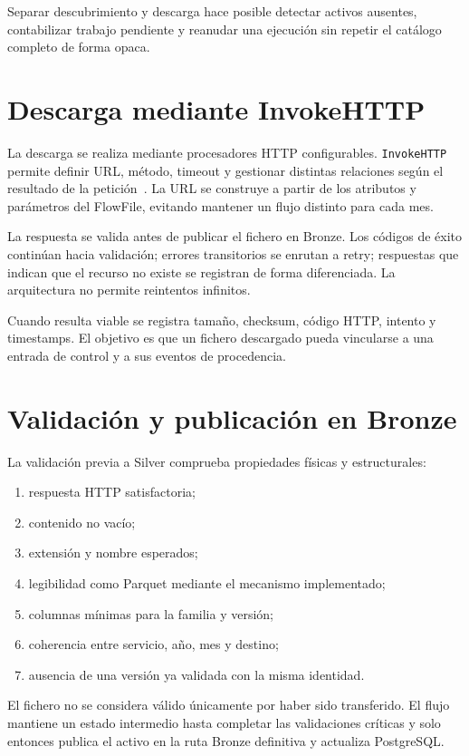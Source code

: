 Separar descubrimiento y descarga hace posible detectar activos ausentes, contabilizar trabajo pendiente y reanudar una ejecución sin repetir el catálogo completo de forma opaca.

\section{Descarga mediante InvokeHTTP}

La descarga se realiza mediante procesadores HTTP configurables. \texttt{InvokeHTTP} permite definir URL, método, timeout y gestionar distintas relaciones según el resultado de la petición~\cite{nifi_invokehttp}. La URL se construye a partir de los atributos y parámetros del FlowFile, evitando mantener un flujo distinto para cada mes.

La respuesta se valida antes de publicar el fichero en Bronze. Los códigos de éxito continúan hacia validación; errores transitorios se enrutan a retry; respuestas que indican que el recurso no existe se registran de forma diferenciada. La arquitectura no permite reintentos infinitos.

Cuando resulta viable se registra tamaño, checksum, código HTTP, intento y timestamps. El objetivo es que un fichero descargado pueda vincularse a una entrada de control y a sus eventos de procedencia.

\section{Validación y publicación en Bronze}

La validación previa a Silver comprueba propiedades físicas y estructurales:

\begin{enumerate}
\item respuesta HTTP satisfactoria;
\item contenido no vacío;
\item extensión y nombre esperados;
\item legibilidad como Parquet mediante el mecanismo implementado;
\item columnas mínimas para la familia y versión;
\item coherencia entre servicio, año, mes y destino;
\item ausencia de una versión ya validada con la misma identidad.
\end{enumerate}

El fichero no se considera válido únicamente por haber sido transferido. El flujo mantiene un estado intermedio hasta completar las validaciones críticas y solo entonces publica el activo en la ruta Bronze definitiva y actualiza PostgreSQL\@.

